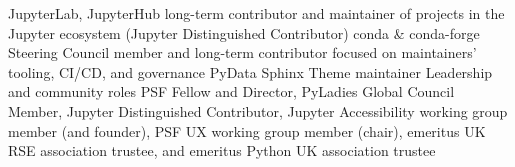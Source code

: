 \begin{cvpress}
 \cvpres
 {JupyterLab, JupyterHub}
 {long-term contributor and maintainer of projects in the Jupyter ecosystem   (Jupyter Distinguished Contributor)}
 {}
 \cvpres
 {conda \& conda-forge}
 {Steering Council member and long-term contributor focused on maintainers' tooling, CI/CD, and governance}
 {}
 \cvpres
 {PyData Sphinx Theme}
 {maintainer}
 {}
 \cvpres
 {Leadership and community roles}
 {PSF Fellow and Director, PyLadies Global Council Member, Jupyter Distinguished Contributor, Jupyter Accessibility working group member (and founder), PSF UX working group member (chair), emeritus UK RSE association trustee, and emeritus Python UK association trustee}
 {}
\end{cvpress}